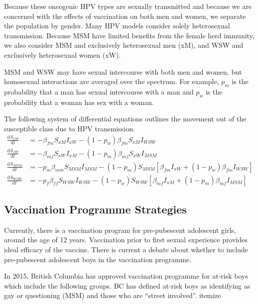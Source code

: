 \documentclass[12pt]{article}
\newcommand{\D}[2]{\frac{\mathrm{d}#1}{\mathrm{d}#2}}
\begin{document}
Because these oncogenic HPV types are sexually transmitted and because we are concerned with the effects of vaccination on both men and women, we separate the population by gender.  Many HPV models consider solely heterosexual transmission.  Because MSM have limited benefits from the female herd immunity, we also consider MSM and exclusively heterosexual men (xM), and WSW and exclusively heterosexual women (xW).  

MSM and WSW may have sexual intercourse with both men and women, but homosexual interactions are averaged over the spectrum.  For example, $p_m$ is the probability that a man has sexual intercourse with a man and $p_w$ is the probability that a woman has sex with a woman.  

The following system of differential equations outlines the movement out of the susceptible class due to HPV transmission. 
\begin{align}
\D{S_{xM}}{t} & = - \beta_{fm}S_{xM}I_{xW} - (1-p_w)\beta_{fm}S_{xM}I_{WSW}\\
\D{S_{xW}}{t} & = - \beta_{mf}S_{xW}I_{xM} - (1-p_m)\beta_{mf}S_{xW}I_{MSM}\\
\D{S_{MSM}}{t} & = -p_m\beta_{mm}S_{MSM}I_{MSM} - (1-p_m)S_{MSM}[\beta_{fm}I_{xW} + (1-p_w)\beta_{fm}I_{WSW}]\\
\D{S_{WSW}}{t} & = -p_f\beta_{ff}S_{WSW}I_{WSW} - (1-p_w)S_{WSW}[\beta_{mf}I_{xM} + (1-p_m)\beta_{mf}I_{MSM}]
\end{align}


\subsection{Vaccination Programme Strategies}

Currently, there is a vaccination program for pre-pubescent adolescent girls, around the age of 12 years.  Vaccination prior to first sexual experience provides ideal efficacy of the vaccine. There is current a debate about whether to include pre-pubescent adolescent boys in the vaccination programme. 

In 2015, British Columbia has approved vaccination programme for at-risk boys which include the following groups.  BC has defined at-risk boys as identifying as gay or questioning (MSM) and those who are ``street involved''.
{itemize}



\newpage


\end{document}
